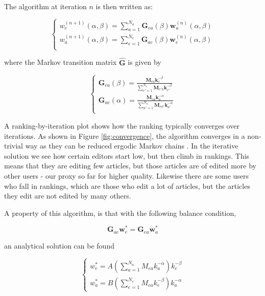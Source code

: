 The algorithm at iteration $n$ is then written as:

\begin{equation}
\begin{cases}
 w^{(n+1)}_e (\alpha,\beta) = \sum_{a=1}^{N_a}  \mathbf{G}_{ea}(\beta) \mathbf{w}^{(n)}_a (\alpha,\beta)\\
w^{(n+1)}_a (\alpha,\beta) = \sum_{e=1}^{N_e}  \mathbf{G}_{ae}(\beta) \mathbf{w}^{(n)}_e (\alpha,\beta)\\
\end{cases}
\end{equation}

where the Markov transition matrix $\mathbf{\hat{G}}$ is given by 

\begin{equation}
\begin{cases}
\mathbf{G}_{ea}(\beta) = \frac{\mathbf{M}_{ea} \mathbf{k}_{e}^{-\beta}}{\sum_{e' = 1}^{N_e} \mathbf{M}_{e'a} \mathbf{k}_{e'}^{-\beta}}\\
\mathbf{G}_{ae}(\alpha) = \frac{\mathbf{M}_{ea} \mathbf{k}_{a}^{-\alpha}}{\sum_{a' = 1}^{N_a} \mathbf{M}_{ea'} \mathbf{k}_{a'}^{-\alpha}}\\
 \end{cases}
\end{equation}


A ranking-by-iteration plot shows how the ranking typically converges over iterations. As shown in Figure \ref{fig:convergence}, the algorithm converges in a non-trivial way as they can be reduced ergodic Markov chains \cite{caldarelli2012network}. In the iterative solution we see how certain editors start low, but then climb in rankings. This means that they are editing few articles, but those articles are of edited more by other users - our proxy so far for higher quality. Likewise there are some users who fall in rankings, which are those who edit a lot of articles, but the articles they edit are not edited by many others.

A property of this algorithm, is that with the following balance condition,

\begin{equation}
\mathbf{G}_{ae} \mathbf{w}^*_e = \mathbf{G}_{ea} \mathbf{w}^*_a
\end{equation}

an analytical solution can be found \cite{caldarelli2012network}

\begin{equation}
\begin{cases}
 w^*_e = A(\sum^{N_a}_{a=1} M_{ea}k_a^{-\alpha})k_e^{-\beta} \\
w^*_a = B(\sum^{N_e}_{e=1} M_{ea}k_e^{-\beta})k_a^{-\alpha}
\end{cases}
\end{equation}


